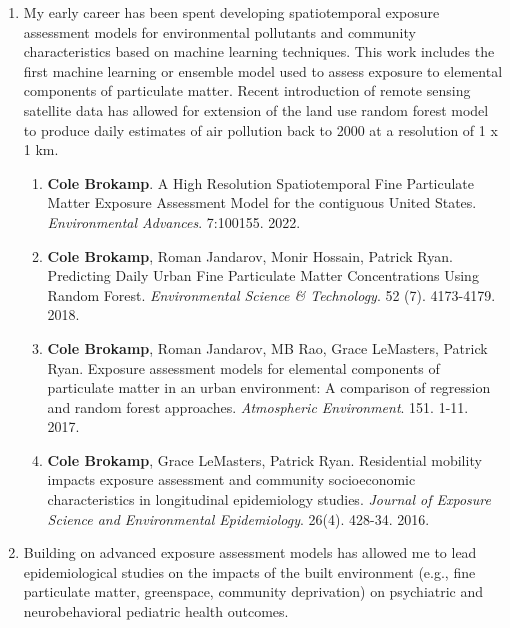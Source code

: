 \documentclass{nihbiosketch}
\begin{document}
\begin{enumerate}

\item My early career has been spent developing spatiotemporal exposure assessment models for
  environmental pollutants and community characteristics based on machine learning
  techniques.  This work includes the first machine
  learning or ensemble model used to assess exposure to elemental components of
  particulate matter. Recent introduction of remote sensing satellite data has
  allowed for extension of the land use random forest model to produce daily
  estimates of air pollution back to 2000 at a resolution of 1 x 1 km.

\begin{enumerate}

  \item \textbf{Cole Brokamp}. A High Resolution Spatiotemporal Fine Particulate Matter Exposure Assessment Model for the contiguous United States. \textit{Environmental Advances}. 7:100155. 2022.

  \item \textbf{Cole Brokamp}, Roman Jandarov, Monir Hossain, Patrick Ryan. Predicting Daily Urban Fine Particulate Matter Concentrations Using Random Forest. \textit{Environmental Science \& Technology}. 52 (7). 4173-4179. 2018.

  \item \textbf{Cole Brokamp}, Roman Jandarov, MB Rao, Grace LeMasters, Patrick Ryan. Exposure assessment models for elemental components of particulate matter in an urban environment: A comparison of regression and random forest approaches. \textit{Atmospheric Environment}. 151. 1-11. 2017.
	
  \item \textbf{Cole Brokamp}, Grace LeMasters, Patrick Ryan. Residential
    mobility impacts exposure assessment and community socioeconomic
    characteristics in longitudinal epidemiology studies. \emph{Journal of
      Exposure Science and Environmental Epidemiology}. 26(4). 428-34. 2016.

\end{enumerate}

\item Building on advanced exposure assessment models has allowed me to lead epidemiological studies on the impacts of the built environment (e.g., fine particulate matter, greenspace, community deprivation) on psychiatric and  neurobehavioral pediatric health outcomes.


\end{enumerate}
\end{document}
